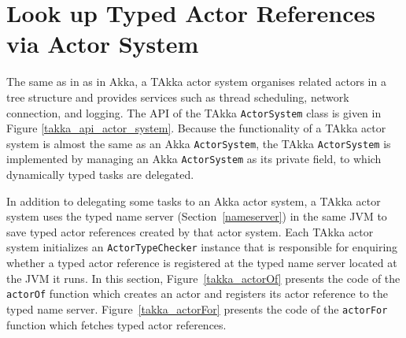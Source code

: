 \section{Look up Typed Actor References via Actor System}
\label{sec:takka_look_up_actor_reference}

The same as in as in Akka, a TAkka actor system organises related actors in a tree 
structure and provides services such as thread scheduling, network connection, 
and logging.  The API of the TAkka {\tt ActorSystem} class is given in Figure 
\ref{takka_api_actor_system}.  Because the functionality of a TAkka actor system 
is almost the same as an Akka {\tt ActorSystem}, the TAkka {\tt ActorSystem} is 
implemented by managing an Akka {\tt ActorSystem} as its private field, to 
which dynamically typed tasks are delegated.   %

In addition to delegating some tasks to an Akka actor system, a TAkka actor 
system uses the typed name server (Section~\ref{nameserver}) in the same JVM to save typed actor 
references created by that actor system.  Each TAkka actor system initializes 
an {\tt ActorTypeChecker} instance that is responsible for enquiring whether a 
typed actor reference is registered at the typed name server located at the JVM 
it runs.  In this section, Figure~\ref{takka_actorOf} presents the code of the 
{\tt actorOf} function which creates an actor and registers its actor reference 
to the typed name server.  Figure~\ref{takka_actorFor} presents the code of the 
{\tt actorFor} function which fetches typed actor references.


